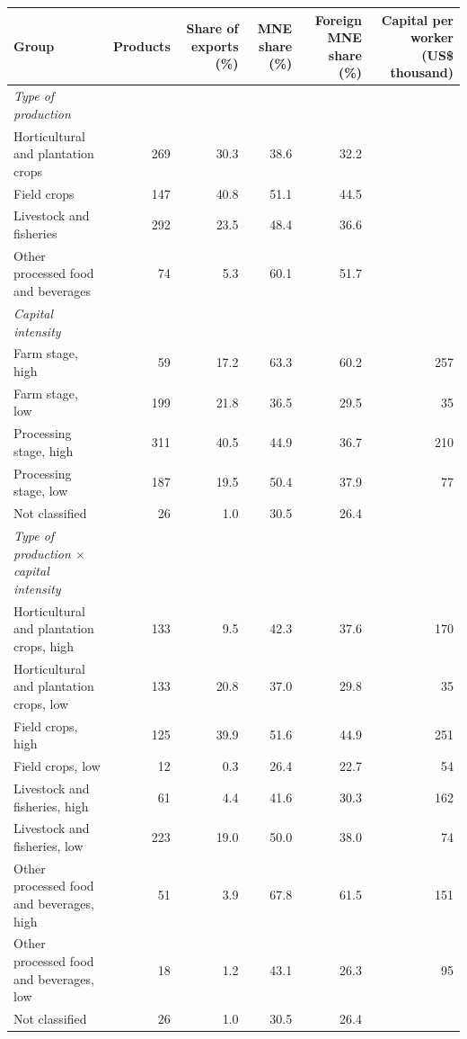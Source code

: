 \begin{tabular}{lrrrrr}
\toprule
Group & Products & Share of exports (\%) & MNE share (\%) & Foreign MNE share (\%) & Capital per worker (US\$ thousand) \\
\midrule
\textit{Type of production} &  &  &  &  &  \\
Horticultural and plantation crops & 269 & 30.3 & 38.6 & 32.2 &  \\
Field crops & 147 & 40.8 & 51.1 & 44.5 &  \\
Livestock and fisheries & 292 & 23.5 & 48.4 & 36.6 &  \\
Other processed food and beverages & 74 & 5.3 & 60.1 & 51.7 &  \\
\textit{Capital intensity} &  &  &  &  &  \\
Farm stage, high & 59 & 17.2 & 63.3 & 60.2 & 257 \\
Farm stage, low & 199 & 21.8 & 36.5 & 29.5 & 35 \\
Processing stage, high & 311 & 40.5 & 44.9 & 36.7 & 210 \\
Processing stage, low & 187 & 19.5 & 50.4 & 37.9 & 77 \\
Not classified & 26 & 1.0 & 30.5 & 26.4 &  \\
\textit{Type of production $\times$ capital intensity} &  &  &  &  &  \\
Horticultural and plantation crops, high & 133 & 9.5 & 42.3 & 37.6 & 170 \\
Horticultural and plantation crops, low & 133 & 20.8 & 37.0 & 29.8 & 35 \\
Field crops, high & 125 & 39.9 & 51.6 & 44.9 & 251 \\
Field crops, low & 12 & 0.3 & 26.4 & 22.7 & 54 \\
Livestock and fisheries, high & 61 & 4.4 & 41.6 & 30.3 & 162 \\
Livestock and fisheries, low & 223 & 19.0 & 50.0 & 38.0 & 74 \\
Other processed food and beverages, high & 51 & 3.9 & 67.8 & 61.5 & 151 \\
Other processed food and beverages, low & 18 & 1.2 & 43.1 & 26.3 & 95 \\
Not classified & 26 & 1.0 & 30.5 & 26.4 &  \\
\bottomrule
\end{tabular}
